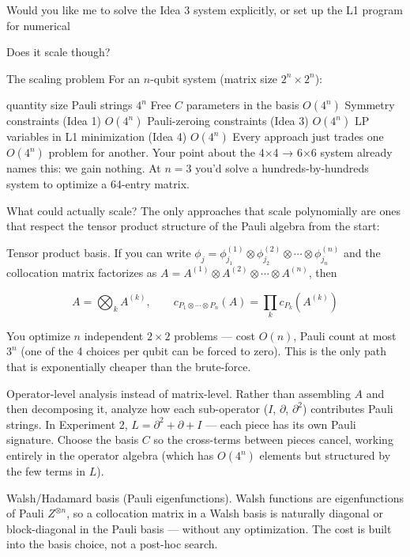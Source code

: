 \documentclass{article}
\begin{document}
Would you like me to solve the Idea 3 system explicitly, or set up the L1 program for numerical

\noindent\makebox[\linewidth]{\rule{\paperwidth}{0.4pt}}

Does it scale though?

The scaling problem
For an $n$-qubit system (matrix size $2^n \times 2^n$):

quantity	size
Pauli strings	$4^n$
Free $C$ parameters in the basis	$O(4^n)$
Symmetry constraints (Idea 1)	$O(4^n)$
Pauli-zeroing constraints (Idea 3)	$O(4^n)$
LP variables in L1 minimization (Idea 4)	$O(4^n)$
Every approach just trades one $O(4^n)$ problem for another. Your point about the 4×4 → 6×6 system already names this: we gain nothing. At $n=3$ you'd solve a hundreds-by-hundreds system to optimize a 64-entry matrix.

What could actually scale?
The only approaches that scale polynomially are ones that respect the tensor product structure of the Pauli algebra from the start:

Tensor product basis. If you can write $\phi_j = \phi_{j_1}^{(1)} \otimes \phi_{j_2}^{(2)} \otimes \cdots \otimes \phi_{j_n}^{(n)}$ and the collocation matrix factorizes as $A = A^{(1)} \otimes A^{(2)} \otimes \cdots \otimes A^{(n)}$, then

$$A = \bigotimes_k A^{(k)}, \qquad c_{P_1\otimes\cdots\otimes P_n}(A) = \prod_k c_{P_k}(A^{(k)})$$

You optimize $n$ independent $2\times 2$ problems — cost $O(n)$, Pauli count at most $3^n$ (one of the 4 choices per qubit can be forced to zero). This is the only path that is exponentially cheaper than the brute-force.

Operator-level analysis instead of matrix-level. Rather than assembling $A$ and then decomposing it, analyze how each sub-operator ($I$, $\partial$, $\partial^2$) contributes Pauli strings. In Experiment 2, $L = \partial^2 + \partial + I$ — each piece has its own Pauli signature. Choose the basis $C$ so the cross-terms between pieces cancel, working entirely in the operator algebra (which has $O(4^n)$ elements but structured by the few terms in $L$).

Walsh/Hadamard basis (Pauli eigenfunctions). Walsh functions are eigenfunctions of Pauli $Z^{\otimes n}$, so a collocation matrix in a Walsh basis is naturally diagonal or block-diagonal in the Pauli basis — without any optimization. The cost is built into the basis choice, not a post-hoc search.
\end{document}
